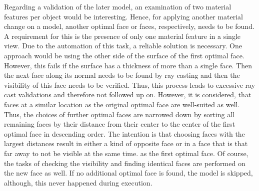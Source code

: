 Regarding a validation of the later model, an examination of two material features per object would be interesting.
Hence, for applying another material change on a model, another optimal face or faces, respectively, needs to be found.
A requirement for this is the presence of only one material feature in a single view.
Due to the automation of this task, a reliable solution is necessary.
One approach would be using the other side of the surface of the first optimal face.
However, this fails if the surface has a thickness of more than a single face.
Then the next face along its normal needs to be found by ray casting and then the visibility of this face needs to be verified.
Thus, this process leads to excessive ray cast validations and therefore not followed up on.
However, it is considered, that faces at a similar location as the original optimal face are well-suited as well.
Thus, the choices of further optimal faces are narrowed down by sorting all remaining faces by their distance from their center to the center of the first optimal face in descending order.
The intention is that choosing faces with the largest distances result in either a kind of opposite face or in a face that is that far away to not be visible at the same time. as the first optimal face.
Of course, the tasks of checking the visibility and finding identical faces are performed on the new face as well.
If no additional optimal face is found, the model is skipped, although, this never happened during execution.